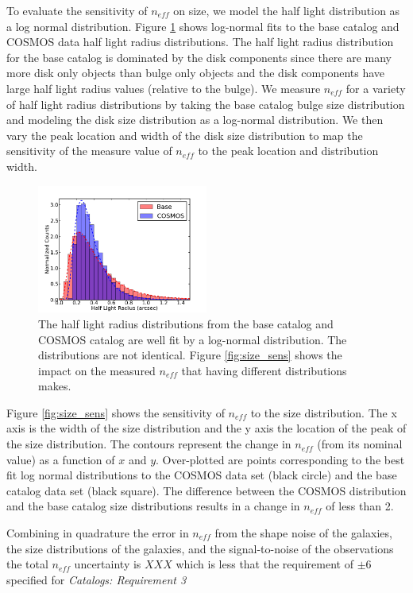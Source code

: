 \documentclass[]{article}
\begin{document}
To evaluate the sensitivity of $n_{eff}$ on size, we model the 
half light distribution as a log normal distribution.  Figure
\ref{fig:ln_fit} shows log-normal fits to the base catalog and COSMOS
data half light radius distributions.  The half light radius
distribution for the base catalog is dominated by the disk components
since there are many more disk only objects than bulge only objects
and the disk components have large half light radius values (relative
to the bulge). We measure $n_{eff}$ for a variety of half light radius
distributions by taking the base catalog bulge size distribution and
modeling the disk size distribution as a log-normal distribution.  We
then vary the peak location and width of the disk size distribution
to map the sensitivity of the measure value of $n_{eff}$ to the peak
location and distribution width.
\begin{figure}[ht]
\centering
\includegraphics[width=0.5\textwidth]{validation_figures/ln_fit.png}
\caption{The half light radius distributions from the base catalog and 
COSMOS catalog are well fit by a log-normal distribution.  The distributions
are not identical.  Figure \ref{fig:size_sens} shows the impact on the  
measured $n_{eff}$ that having different distributions makes.
    \label{fig:ln_fit}}
\end{figure}

Figure \ref{fig:size_sens} shows the sensitivity of $n_{eff}$ to the
size distribution.  The x axis is the width of the size distribution
and the y axis the location of the peak of the size distribution. The
contours represent the change in $n_{eff}$ (from its nominal value) as
a function of $x$ and $y$. Over-plotted are points corresponding to
the best fit log normal distributions to the COSMOS data set (black
circle) and the base catalog data set (black square).  The difference
between the COSMOS distribution and the base catalog size distributions
results in a change in $n_{eff}$ of less than 2. 

Combining in quadrature the error in $n_{eff}$ from the shape noise of
the galaxies, the size distributions of the galaxies, and the
signal-to-noise of the observations the total $n_{eff}$ uncertainty is
$XXX$ which is less that the requirement of  $\pm6$ specified for {\it
  Catalogs:  Requirement 3}
\end{document}
